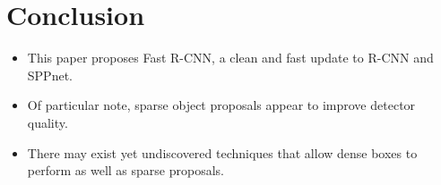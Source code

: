 \documentclass[11pt]{book}
\begin{document}
\chapter{Conclusion}
\label{sec-1-5}


\begin{itemize}
\item This paper proposes Fast R-CNN, a clean and fast update to R-CNN and SPPnet.
\item Of particular note, sparse object proposals appear to improve detector quality.
\item There may exist yet undiscovered techniques that allow dense boxes to perform 
     as well as sparse proposals.
\end{itemize}
\end{document}
